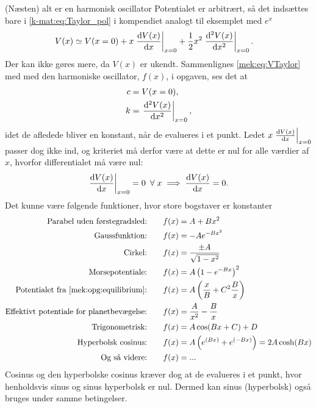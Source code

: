 \documentclass[crop=false, class=memoir]{standalone}
\begin{document}
\begin{opgave}[2]{(Næsten) alt er en harmonisk oscillator}
%
\opg Potentialet er arbitrært, så det indsættes bare i \cref{k-mat:eq:Taylor_pol} i kompendiet analogt til eksemplet med $e^x$
%
\begin{align} \label{mek:eq:VTaylor}
	V(x) \simeq V(x=0) &+ x\left.\dv{V(x)}{x}\right|_{x=0} + \frac{1}{2}x^2\left.\dv[2]{V(x)}{x}\right|_{x=0}.
\end{align}
%
Der kan ikke gøres mere, da $V(x)$ er ukendt.
\opg Sammenlignes \cref{mek:eq:VTaylor} med med den harmoniske oscillator, $f(x)$, i opgaven, ses det at
%
\begin{align*}
	c &= V(x=0), \\
	k &= \left.\dv[2]{V(x)}{x}\right|_{x=0},
\end{align*}
%
idet de afledede bliver en konstant, når de evalueres i et punkt. Ledet $x\left.\dv{V(x)}{x}\right|_{x=0}$ passer dog ikke ind, og kriteriet må derfor være at dette er nul for alle værdier af $x$, hvorfor differentialet må være nul:
%
\begin{align*}
	\left.\dv{V(x)}{x}\right|_{x=0} = 0 \enspace\forall \; x \implies \dv{V(x)}{x} = 0.
\end{align*}
%
\opg Det kunne være følgende funktioner, hvor store bogstaver er konstanter
%
\begingroup
\allowdisplaybreaks
%
\begin{align*}
	\text{Parabel uden førstegradsled:} \qquad
	&f(x) = A + Bx^2 \\
	\text{Gaussfunktion:} \qquad
	&f(x) = -Ae^{-Bx^2}\\
	\text{Cirkel:} \qquad
	&f(x) = \frac{\pm A}{\sqrt{1-x^2}}\\
	\text{Morsepotentiale:} \qquad
	&f(x) = A\left(1-e^{-Bx}\right)^2\\
	\text{Potentialet fra \cref{mek:opg:equilibrium}:} \qquad
	&f(x) = A\left(\frac{x}{B}+C^2\frac{B}{x}\right)\\
	\text{Effektivt potentiale for planetbevægelse:} \qquad
	&f(x) = \frac{A}{x^2}-\frac{B}{x} \\
	\text{Trigonometrisk:} \qquad
	&f(x) = A\cos(Bx + C) + D \\
	\text{Hyperbolsk cosinus:} \qquad
	&f(x) = A\left(e^{(Bx)} + e^{(-Bx)}\right) = 2A\cosh(Bx) \\
	\text{Og så videre:} \qquad &f(x) = ... 
\end{align*}
%
\endgroup
%
Cosinus og den hyperbolske cosinus kræver dog at de evalueres i et punkt, hvor henholdsvis sinus og sinus hyperbolsk er nul. Dermed kan sinus (hyperbolsk) også bruges under samme betingelser.

\end{opgave}
\end{document}
